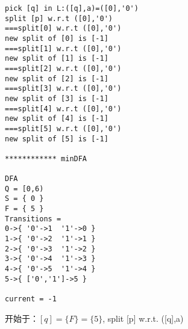 \begin{lstlisting}
pick [q] in L:([q],a)=([0],'0')
split [p] w.r.t ([0],'0')
===split[0] w.r.t ([0],'0')
new split of [0] is [-1]
===split[1] w.r.t ([0],'0')
new split of [1] is [-1]
===split[2] w.r.t ([0],'0')
new split of [2] is [-1]
===split[3] w.r.t ([0],'0')
new split of [3] is [-1]
===split[4] w.r.t ([0],'0')
new split of [4] is [-1]
===split[5] w.r.t ([0],'0')
new split of [5] is [-1]

************ minDFA

DFA
Q = [0,6)
S = { 0 }
F = { 5 }
Transitions = 
0->{ '0'->1  '1'->0 }
1->{ '0'->2  '1'->1 }
2->{ '0'->3  '1'->2 }
3->{ '0'->4  '1'->3 }
4->{ '0'->5  '1'->4 }
5->{ ['0','1']->5 }

current = -1

\end{lstlisting}

开始于：$[q]=\{F\} = \{5\}$, split [p] w.r.t. ([q],a)

